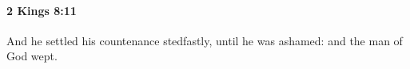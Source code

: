 
		\paragraph{2 Kings 8:11} %
			\label{2KINGS-8-11}

			And he settled his countenance stedfastly, until he was ashamed: and the man of God wept.


